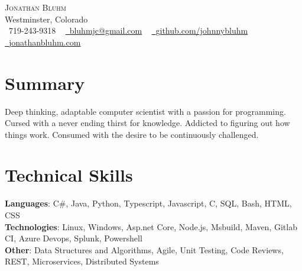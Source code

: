 \documentclass[letterpaper,11pt]{article}
\begin{document}

\begin{center}
    {\Huge \scshape Jonathan Bluhm} \\ \vspace{1pt}
    Westminster, Colorado \\ \vspace{1pt}
    \small \raisebox{-0.1\height}\faPhone\ 719-243-9318 ~ \href{mailto:bluhmjc@gmail.com}{\raisebox{-0.2\height}\faEnvelope\  \underline{bluhmjc@gmail.com}} ~ 
    \href{https://github.com/johnnybluhm}{\raisebox{-0.2\height}\faGithub\ \underline{github.com/johnnybluhm}} ~
    \href{https://jonathanbluhm.com}{\raisebox{-0.2\height}\faChrome\ \underline{jonathanbluhm.com}}
    \vspace{-8pt}
\end{center}

\section{Summary}
 Deep thinking, adaptable computer scientist with a passion for programming. Cursed with a never ending thirst for knowledge. Addicted to figuring out how things work. Consumed with the desire to be continuously challenged.
\vspace{-10pt}

%
\section{Technical Skills}
 \begin{itemize}[leftmargin=0.15in, label={}]
    \small{\item{
     \textbf{Languages}{: C\#, Java, Python, Typescript, Javascript, C, SQL, Bash, HTML, CSS} \\
     \textbf{Technologies}{: Linux, Windows, Asp.net Core, Node.js, Msbuild, Maven, Gitlab CI, Azure Devops, Splunk, Powershell} \\
     \textbf{Other}{: Data Structures and Algorithms, Agile, Unit Testing, Code Reviews, REST, Microservices, Distributed Systems} \\
    }}
 \end{itemize}
 \vspace{-16pt}
\end{document}
